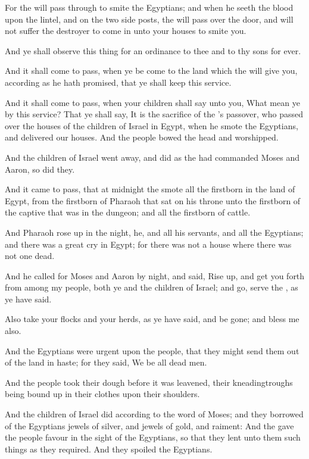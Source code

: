 \verse For the \LORD will pass through to smite the Egyptians; and when he seeth the blood upon the lintel, and on the two side posts, the \LORD will pass over the door, and will not suffer the destroyer to come in unto your houses to smite you.

\verse And ye shall observe this thing for an ordinance to thee and to thy sons for ever.

\verse And it shall come to pass, when ye be come to the land which the \LORD will give you, according as he hath promised, that ye shall keep this service.

\verse And it shall come to pass, when your children shall say unto you, What mean ye by this service?  \verse That ye shall say, It is the sacrifice of the \LORD's passover, who passed over the houses of the children of Israel in Egypt, when he smote the Egyptians, and delivered our houses. And the people bowed the head and worshipped.

\verse And the children of Israel went away, and did as the \LORD had commanded Moses and Aaron, so did they.

\verse And it came to pass, that at midnight the \LORD smote all the firstborn in the land of Egypt, from the firstborn of Pharaoh that sat on his throne unto the firstborn of the captive that was in the dungeon; and all the firstborn of cattle.

\verse And Pharaoh rose up in the night, he, and all his servants, and all the Egyptians; and there was a great cry in Egypt; for there was not a house where there was not one dead.

\verse And he called for Moses and Aaron by night, and said, Rise up, and get you forth from among my people, both ye and the children of Israel; and go, serve the \LORD, as ye have said.

\verse Also take your flocks and your herds, as ye have said, and be gone; and bless me also.

\verse And the Egyptians were urgent upon the people, that they might send them out of the land in haste; for they said, We be all dead men.

\verse And the people took their dough before it was leavened, their kneadingtroughs being bound up in their clothes upon their shoulders.

\verse And the children of Israel did according to the word of Moses; and they borrowed of the Egyptians jewels of silver, and jewels of gold, and raiment: \verse And the \LORD gave the people favour in the sight of the Egyptians, so that they lent unto them such things as they required. And they spoiled the Egyptians.

